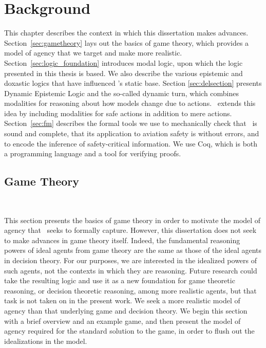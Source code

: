 \chapter{Background}
	\label{CH_02}

This chapter describes the context in which this dissertation makes advances. Section~\ref{sec:gametheory} lays out the basics of game theory, which provides a model of agency that we target and make more realistic. Section~\ref{sec:logic_foundation} introduces modal logic, upon which the logic presented in this thesis is based. We also describe the various epistemic and doxastic logics that have influenced \DASL's static base. Section \ref{sec:delsection} presents Dynamic Epistemic Logic and the so-called dynamic turn, which combines modalities for reasoning about how models change due to actions. \DASL\ extends this idea by including modalities for safe actions in addition to mere actions. Section~\ref{sec:fm} describes the formal tools we use to mechanically check that \DASL\ is sound and complete, that its application to aviation safety is without errors, and to encode the inference of safety-critical information. We use Coq, which is both a programming language and a tool for verifying proofs. 




\section{Game Theory}~\label{sec:gametheory}

This section presents the basics of game theory in order to motivate the model of agency that \DASL\ seeks to formally capture. However, this dissertation does not seek to make advances in game theory itself. Indeed, the fundamental reasoning powers of ideal agents from game theory are the same as those of the ideal agents in decision theory. For our purposes, we are interested in the idealized powers of such agents, not the contexts in which they are reasoning. Future research could take the resulting logic and use it as a new foundation for game theoretic reasoning, or decision theoretic reasoning, among more realistic agents, but that task is not taken on in the present work. We seek a more realistic model of agency than that underlying game and decision theory. We begin this section with a brief overview and an example game, and then present the model of agency required for the standard solution to the game, in order to flush out the idealizations in the model.

